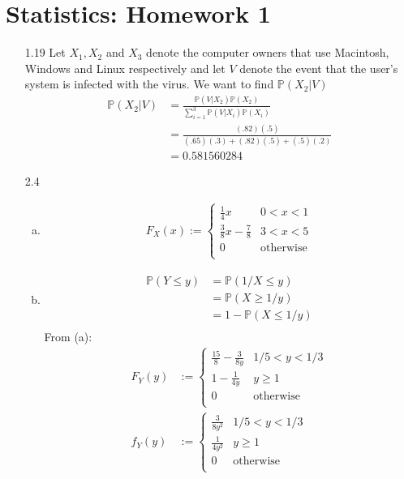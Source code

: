 \documentclass[a4paper,10pt]{article}
\theoremstyle{definition}
\begin{document}
\section*{Statistics: Homework 1}

\begin{enumerate}
\item[1.19] Let $X_1, X_2$ and $X_3$ denote the computer owners that use Macintosh, Windows and Linux respectively and let $V$ denote the event that the user's system is infected with the virus. We want to find $\mathbb{P}(X_2 | V)$
\begin{align*}
\mathbb{P}(X_2 | V) &= \frac{\mathbb{P}(V|X_2)\mathbb{P}(X_2)}{\sum_{i=1}^{3}\mathbb{P}(V|X_i)\mathbb{P}(X_i)}\\
&=\frac{(.82)(.5)}{(.65)(.3)+(.82)(.5)+(.5)(.2)}\\
&=0.581560284
\end{align*}
\item[2.4] 
\begin{enumerate}[(a)]
\item 
\begin{align*}
F_X(x):= \begin{cases}
\frac{1}{4}x & 0 < x < 1\\
\frac{3}{8}x-\frac{7}{8} & 3 < x < 5\\
0 & \text{otherwise}\\
\end{cases}
\end{align*}
\item
\begin{align*}
\mathbb{P}(Y \leq y) &= \mathbb{P}(1/X\leq y)\\
&=\mathbb{P}(X\geq 1/y)\\
&=1 - \mathbb{P}(X\leq 1/y)\\
\end{align*}
From (a):
\begin{align*}
F_Y(y)&:= \begin{cases}
\frac{15}{8}-\frac{3}{8y} & 1/5 < y < 1/3\\
1 - \frac{1}{4y} & y \geq 1\\
0 & \text{otherwise}\\
\end{cases}\\
f_Y(y)&:= \begin{cases}
\frac{3}{8y^2} & 1/5 < y < 1/3\\
\frac{1}{4y^2} & y \geq 1\\
0 & \text{otherwise}\\
\end{cases}
\end{align*}


\end{enumerate}
\end{enumerate}
\end{document}
